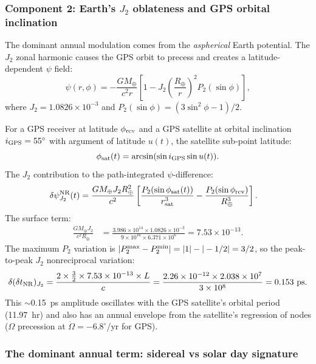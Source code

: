 \documentclass[aps,prd,twocolumn,superscriptaddress,nofootinbib,longbibliography]{revtex4-2}
\begin{document}
\subsubsection{Component 2: Earth's $J_2$ oblateness and GPS orbital inclination}

The dominant annual modulation comes from the \emph{aspherical} Earth potential.
The $J_2$ zonal harmonic causes the GPS orbit to precess and creates a
latitude-dependent $\psi$ field:
\begin{equation}
\psi(r,\phi) = -\frac{GM_\oplus}{c^2 r}\left[1 - J_2\left(\frac{R_\oplus}{r}\right)^2
P_2(\sin\phi)\right],
\end{equation}
where $J_2 = 1.0826\times10^{-3}$ and $P_2(\sin\phi) = (3\sin^2\phi - 1)/2$.

For a GPS receiver at latitude $\phi_{\rm rcv}$ and a GPS satellite at
orbital inclination $i_{\rm GPS} = 55^\circ$ with argument of latitude $u(t)$,
the satellite sub-point latitude:
\begin{equation}
\phi_{\rm sat}(t) = \arcsin(\sin i_{\rm GPS}\sin u(t)).
\end{equation}
The $J_2$ contribution to the path-integrated $\psi$-difference:
\begin{align}
\delta\psi_{J_2}^{\rm NR}(t) &= \frac{GM_\oplus J_2 R_\oplus^2}{c^2}
\left[\frac{P_2(\sin\phi_{\rm sat}(t))}{r_{\rm sat}^3}
- \frac{P_2(\sin\phi_{\rm rcv})}{R_\oplus^3}\right].
\end{align}
The surface term:
\begin{align}
\frac{GM_\oplus J_2}{c^2 R_\oplus} &=
\frac{3.986\times10^{14}\times1.0826\times10^{-3}}{9\times10^{16}\times6.371\times10^6}
= 7.53\times10^{-13}.
\end{align}
The maximum $P_2$ variation is $|P_2^{\rm max} - P_2^{\rm min}|
= |1| - |-1/2| = 3/2$, so the peak-to-peak $J_2$ nonreciprocal variation:
\begin{equation}
\delta(\delta t_{\rm NR})_{J_2}
= \frac{2\times\frac{3}{2}\times7.53\times10^{-13}\times L}{c}
= \frac{2.26\times10^{-12}\times2.038\times10^7}{3\times10^8}
= 0.153\ \si{ps}.
\end{equation}
This $\sim$0.15~ps amplitude oscillates with the GPS satellite's orbital period
(11.97~hr) and also has an annual envelope from the satellite's regression
of nodes ($\Omega$ precession at $\dot\Omega = -6.8^\circ$/yr for GPS).

\subsubsection{The dominant annual term: sidereal vs solar day signature}
\end{document}
